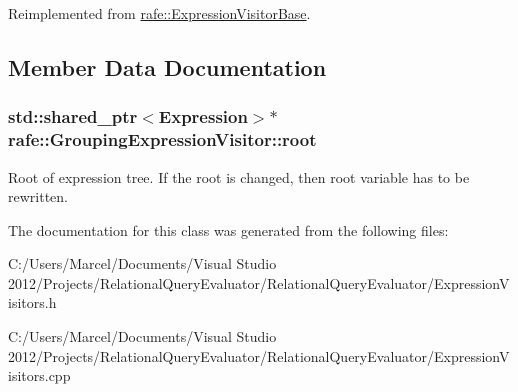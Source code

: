Reimplemented from \hyperlink{classrafe_1_1_expression_visitor_base_a63e53276af3a22d3592f34d05ba97014}{rafe\+::\+Expression\+Visitor\+Base}.



\subsection{Member Data Documentation}
\hypertarget{classrafe_1_1_grouping_expression_visitor_a95a43ca2fdb2670f5407d7b38fff1e9e}{
\subsubsection[{root}]{\setlength{\rightskip}{0pt plus 5cm}std\+::shared\+\_\+ptr$<${\bf Expression}$>$$\ast$ rafe\+::\+Grouping\+Expression\+Visitor\+::root}}\label{classrafe_1_1_grouping_expression_visitor_a95a43ca2fdb2670f5407d7b38fff1e9e}
Root of expression tree. If the root is changed, then root variable has to be rewritten. 

The documentation for this class was generated from the following files\+:\begin{DoxyCompactItemize}
\item 
C\+:/\+Users/\+Marcel/\+Documents/\+Visual Studio 2012/\+Projects/\+Relational\+Query\+Evaluator/\+Relational\+Query\+Evaluator/Expression\+Visitors.\+h\item 
C\+:/\+Users/\+Marcel/\+Documents/\+Visual Studio 2012/\+Projects/\+Relational\+Query\+Evaluator/\+Relational\+Query\+Evaluator/Expression\+Visitors.\+cpp\end{DoxyCompactItemize}
